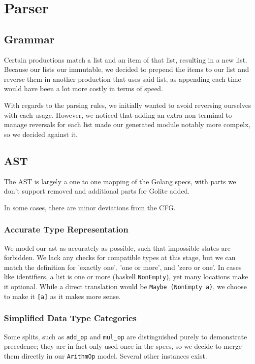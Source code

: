 \documentclass[11pt]{article}
\begin{document}
\section{Parser}
\label{sec:orga40ab98}
\subsection{Grammar}
\label{sec:org6794199}
Certain productions match a list and an item of that list,
resulting in a new list. Because our lists our immutable, we
decided to prepend the items to our list and reverse them in
another production that uses said list, as appending each time
would have been a lot more costly in terms of speed.

With regards to the parsing rules, we initially wanted to avoid 
reversing ourselves with each usage. However, we noticed that adding 
an extra non terminal to manage reversals for each list made our 
generated module notably more compelx, so we decided against it.
\subsection{AST}
\label{sec:org01c20d9}
The AST is largely a one to one mapping of the Golang specs, with
parts we don't support removed and additional parts for Golite added.

In some cases, there are minor deviations from the CFG.
\subsubsection{Accurate Type Representation}
\label{sec:orge3165c3}
We model our ast as accurately as possible, such that impossible
states are forbidden. We lack any checks for compatible types at
this stage, but we can match the definition for 'exactly one', 'one
or more', and 'zero or one'. In cases like identifiers, a \href{https://golang.org/ref/spec\#IdentifierList}{list} is
one or more (haskell \texttt{NonEmpty}), yet many locations make it
optional. While a direct translation would be \texttt{Maybe (NonEmpty a)},
we choose to make it \texttt{[a]} as it makes more sense.
\subsubsection{Simplified Data Type Categories}
\label{sec:org1617070}
Some splits, such as \texttt{add\_op} and \texttt{mul\_op} are distinguished
purely to demonstrate precedence; they are in fact only used once
in the specs, so we decide to merge them directly in our \texttt{ArithmOp}
model. Several other instances exist.
\end{document}
